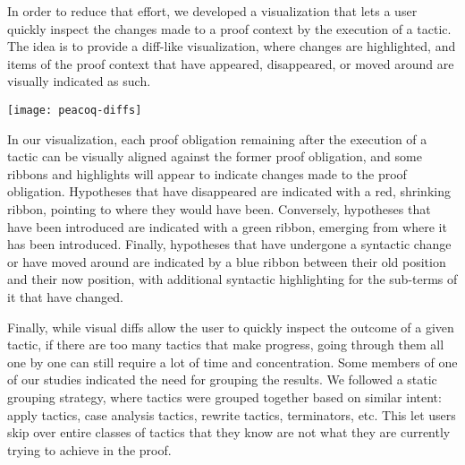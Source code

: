In order to reduce that effort, we developed a visualization that lets a user
quickly inspect the changes made to a proof context by the execution of a
tactic.  The idea is to provide a diff-like visualization, where changes are
highlighted, and items of the proof context that have appeared, disappeared, or
moved around are visually indicated as such.

\texttt{[image: peacoq-diffs]}{\parfillskip=0pt\par}

In our visualization, each proof obligation remaining after the execution of a
tactic can be visually aligned against the former proof obligation, and some
ribbons and highlights will appear to indicate changes made to the proof
obligation.  Hypotheses that have disappeared are indicated with a red,
shrinking ribbon, pointing to where they would have been.  Conversely,
hypotheses that have been introduced are indicated with a green ribbon, emerging
from where it has been introduced.  Finally, hypotheses that have undergone a
syntactic change or have moved around are indicated by a blue ribbon between
their old position and their now position, with additional syntactic
highlighting for the sub-terms of it that have changed.

Finally, while visual diffs allow the user to quickly inspect the outcome of a
given tactic, if there are too many tactics that make progress, going through
them all one by one can still require a lot of time and concentration.  Some
members of one of our studies indicated the need for grouping the results.  We
followed a static grouping strategy, where tactics were grouped together based
on similar intent: apply tactics, case analysis tactics, rewrite tactics,
terminators, etc.  This let users skip over entire classes of tactics that they
know are not what they are currently trying to achieve in the proof.
